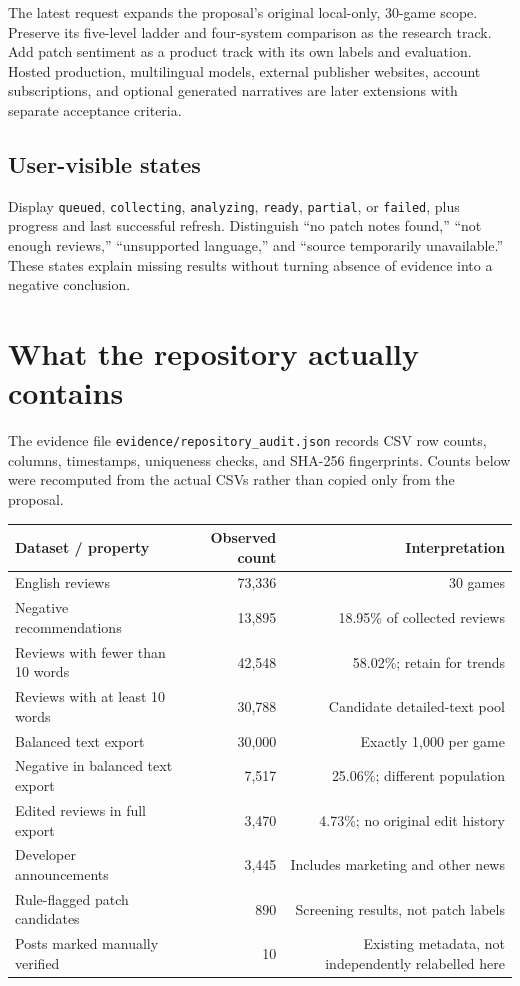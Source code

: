 \documentclass[10pt,letterpaper]{article}
\newcommand{\nextsection}[1]{\clearpage\section{#1}}
\begin{document}
The latest request expands the proposal's original local-only, 30-game scope. Preserve its five-level ladder and four-system comparison as the research track. Add patch sentiment as a product track with its own labels and evaluation. Hosted production, multilingual models, external publisher websites, account subscriptions, and optional generated narratives are later extensions with separate acceptance criteria.

\subsection{User-visible states}
Display \texttt{queued}, \texttt{collecting}, \texttt{analyzing}, \texttt{ready}, \texttt{partial}, or \texttt{failed}, plus progress and last successful refresh. Distinguish ``no patch notes found,'' ``not enough reviews,'' ``unsupported language,'' and ``source temporarily unavailable.'' These states explain missing results without turning absence of evidence into a negative conclusion.

\nextsection{What the repository actually contains}
The evidence file \texttt{evidence/repository\_audit.json} records CSV row counts, columns, timestamps, uniqueness checks, and SHA-256 fingerprints. Counts below were recomputed from the actual CSVs rather than copied only from the proposal.

\begin{tabularx}{\linewidth}{Yrr}
\toprule
Dataset / property & Observed count & Interpretation \\
\midrule
English reviews & 73,336 & 30 games \\
Negative recommendations & 13,895 & 18.95\% of collected reviews \\
Reviews with fewer than 10 words & 42,548 & 58.02\%; retain for trends \\
Reviews with at least 10 words & 30,788 & Candidate detailed-text pool \\
Balanced text export & 30,000 & Exactly 1,000 per game \\
Negative in balanced text export & 7,517 & 25.06\%; different population \\
Edited reviews in full export & 3,470 & 4.73\%; no original edit history \\
Developer announcements & 3,445 & Includes marketing and other news \\
Rule-flagged patch candidates & 890 & Screening results, not patch labels \\
Posts marked manually verified & 10 & Existing metadata, not independently relabelled here \\
\bottomrule
\end{tabularx}
\end{document}
